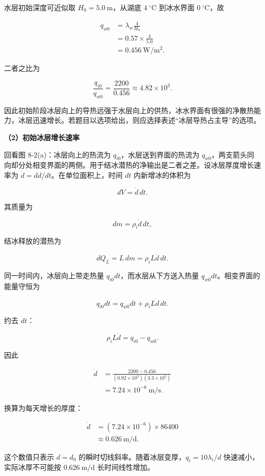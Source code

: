 \documentclass[12pt,a4paper,UTF8]{ctexart}
\begin{document}
水层初始深度可近似取 \(H_0=5.0\ \mathrm m\)，从湖底
\(4\ ^\circ\mathrm C\) 到冰水界面 \(0\ ^\circ\mathrm C\)，故

\[
\begin{aligned}
q_{w0}
&=\lambda_w\frac{4}{H_0}\\
&=0.57\times\frac4{5.0}\\
&=\boxed{0.456\ \mathrm{W/m^2}}.
\end{aligned}\tag{3}
\]

二者之比为

\[
\frac{q_{i0}}{q_{w0}}
=\frac{2200}{0.456}
\approx4.82\times10^3.
\tag{4}
\]

因此初始阶段冰层向上的导热远强于水层向上的供热，冰水界面有很强的净散热能力，冰层迅速增长。若题目以选项给出，则应选择表述``冰层导热占主导''的选项。

\textbf{（2）初始冰层增长速率}

回看图 8-2(a)：冰层向上的热流为 \(q_{i0}\)，水层送到界面的热流为
\(q_{w0}\)，两支箭头同向却分处相变界面的两侧。用于结冰潜热的净输出是二者之差。设冰层厚度增长速率为
\(\dot d=dd/dt\)。在单位面积上，时间 \(dt\) 内新增冰的体积为

\[
dV=\dot d\,dt.
\]

其质量为

\[
dm=\rho_i\dot d\,dt,
\]

结冰释放的潜热为

\[
dQ_L=L\,dm=\rho_iL\dot d\,dt.
\tag{5}
\]

同一时间内，冰层向上带走热量 \(q_{i0}dt\)，而水层从下方送入热量
\(q_{w0}dt\)。相变界面的能量守恒为

\[
q_{i0}dt=q_{w0}dt+\rho_iL\dot d\,dt.
\tag{6}
\]

约去 \(dt\)：

\[
\rho_iL\dot d=q_{i0}-q_{w0}.
\tag{7}
\]

因此

\[
\begin{aligned}
\dot d
&=\frac{2200-0.456}
{(0.92\times10^3)(3.3\times10^5)}\\
&=\boxed{7.24\times10^{-6}\ \mathrm{m/s}}.
\end{aligned}\tag{8}
\]

换算为每天增长的厚度：

\[
\begin{aligned}
\dot d
&=(7.24\times10^{-6})\times86400\\
&\approx\boxed{0.626\ \mathrm{m/d}}.
\end{aligned}\tag{9}
\]

这个数值只表示 \(d=d_0\)
的瞬时切线斜率。随着冰层变厚，\(q_i=10\lambda_i/d\)
快速减小，实际冰厚不可能按 \(0.626\ \mathrm{m/d}\) 长时间线性增加。
\end{document}
